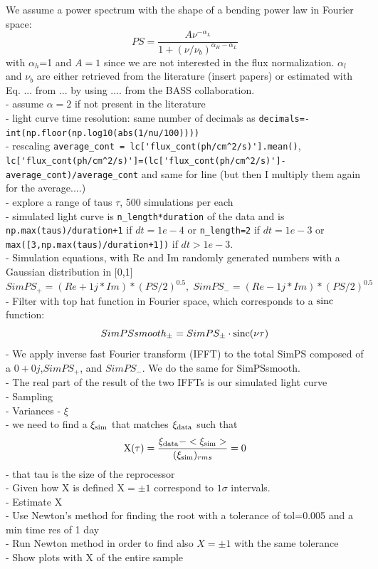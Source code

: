 We assume a power spectrum with the shape of a bending power law in Fourier space:
\begin{equation}
    PS=\frac{A\nu^{-\alpha_L}}{1+(\nu/\nu_b)^{\alpha_H-\alpha_L}}
\end{equation}
with $\alpha_h$=1 and $A=1$ since we are not interested in the flux normalization. $\alpha_l$ and $\nu_b$ are either retrieved from the literature (insert papers) or estimated with Eq. ... from ... by using .... from the BASS collaboration. \\
- assume $\alpha=2$ if not present in the literature\\
- light curve time resolution: same number of decimals as \verb+decimals=-int(np.floor(np.log10(abs(1/nu/100))))+ \\
- rescaling    \verb+average_cont = lc['flux_cont(ph/cm^2/s)'].mean()+, 
   \verb+lc['flux_cont(ph/cm^2/s)']=(lc['flux_cont(ph/cm^2/s)']-average_cont)/average_cont+ and same for line (but then I multiply them again for the average....)\\
- explore a range of taus $\tau$, 500 simulations per each \\
- simulated light curve is \verb+n_length*duration+ of the data and is \verb-np.max(taus)/duration+1- if $dt=1e-4$ or \verb+n_length=2+ if $dt=1e-3$ or \verb-max([3,np.max(taus)/duration+1])- if $dt>1e-3$.\\
- Simulation equations, with Re and Im randomly generated numbers with a Gaussian distribution in [0,1]
\begin{equation}
    SimPS_+=(Re+1j*Im)*(PS/2)^{0.5}, \;
    SimPS_-=(Re-1j*Im)*(PS/2)^{0.5}
\end{equation}
- Filter with top hat function in Fourier space, which corresponds to a $\operatorname{sinc}$ function:
\begin{equation}
    SimPSsmooth_\pm=SimPS_\pm\cdot\operatorname{sinc}(\nu\tau)
\end{equation}
- We apply inverse fast Fourier transform (IFFT) to the total SimPS composed of a $0+0j$,$SimPS_+$, and $SimPS_-$. We do the same for SimPSsmooth. \\
- The real part of the result of the two IFFTs is our simulated light curve \\
- Sampling \\
- Variances - $\xi$ \\
- we need to find a $\xi_{\rm sim}$ that matches $\xi_{\rm data}$ such that
\begin{equation}
    {\rm X}(\tau)=\frac{\xi_{\rm data}-<\xi_{\rm sim}>}{(\xi_{\rm sim})_{rms}}=0
\end{equation}
- that tau is the size of the reprocessor\\
- Given how X is defined X$=\pm1$ correspond to $1\sigma$ intervals.\\
- Estimate X \\
- Use Newton's method for finding the root with a tolerance of tol=0.005 and a min time res of 1 day\\
- Run Newton method in order to find also $X=\pm1$ with the same tolerance\\
- Show plots with X of the entire sample


